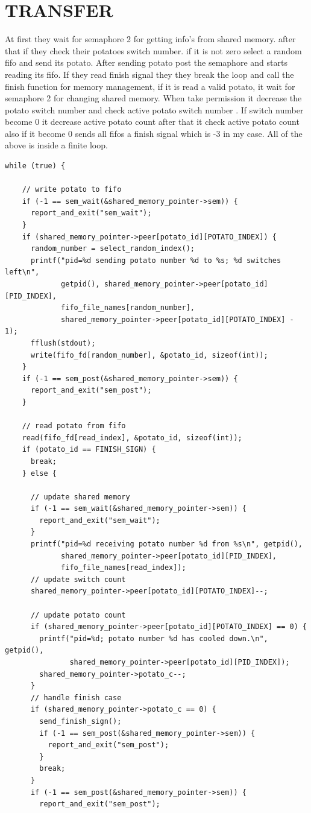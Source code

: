 \documentclass{article}
\begin{document}
\section{TRANSFER}
At first they wait for semaphore 2 for getting info's from shared memory. after that if they check their potatoes switch number. if it is not zero select a random fifo and send its potato.
After sending potato post the semaphore and starts reading its fifo. If they read finish signal they they break the loop and call the finish function for memory management, if it is read a valid potato, it wait for semaphore 2 for changing shared memory.
When take permission it decrease the potato switch number and check active potato switch number . If switch number become 0 it decrease  active potato count after that it check active potato count also if it  become 0 sends all fifos a finish signal which is -3 in my case. All of the above is inside a finite loop.
\pagebreak
\begin{verbatim}
while (true) {

    // write potato to fifo
    if (-1 == sem_wait(&shared_memory_pointer->sem)) {
      report_and_exit("sem_wait");
    }
    if (shared_memory_pointer->peer[potato_id][POTATO_INDEX]) {
      random_number = select_random_index();
      printf("pid=%d sending potato number %d to %s; %d switches left\n",
             getpid(), shared_memory_pointer->peer[potato_id][PID_INDEX],
             fifo_file_names[random_number],
             shared_memory_pointer->peer[potato_id][POTATO_INDEX] - 1);
      fflush(stdout);
      write(fifo_fd[random_number], &potato_id, sizeof(int));
    }
    if (-1 == sem_post(&shared_memory_pointer->sem)) {
      report_and_exit("sem_post");
    }

    // read potato from fifo
    read(fifo_fd[read_index], &potato_id, sizeof(int));
    if (potato_id == FINISH_SIGN) {
      break;
    } else {

      // update shared memory
      if (-1 == sem_wait(&shared_memory_pointer->sem)) {
        report_and_exit("sem_wait");
      }
      printf("pid=%d receiving potato number %d from %s\n", getpid(),
             shared_memory_pointer->peer[potato_id][PID_INDEX],
             fifo_file_names[read_index]);
      // update switch count
      shared_memory_pointer->peer[potato_id][POTATO_INDEX]--;

      // update potato count
      if (shared_memory_pointer->peer[potato_id][POTATO_INDEX] == 0) {
        printf("pid=%d; potato number %d has cooled down.\n", getpid(),
               shared_memory_pointer->peer[potato_id][PID_INDEX]);
        shared_memory_pointer->potato_c--;
      }
      // handle finish case
      if (shared_memory_pointer->potato_c == 0) {
        send_finish_sign();
        if (-1 == sem_post(&shared_memory_pointer->sem)) {
          report_and_exit("sem_post");
        }
        break;
      }
      if (-1 == sem_post(&shared_memory_pointer->sem)) {
        report_and_exit("sem_post");
\end{verbatim}
\pagebreak
\end{document}

